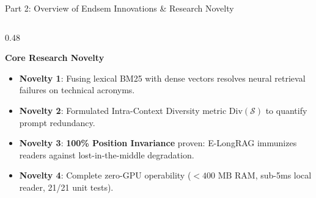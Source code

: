 \documentclass[10pt,aspectratio=169]{beamer}
\begin{document}
\begin{frame}{Part 2: Overview of Endsem Innovations \& Research Novelty}
\begin{columns}[onlytextwidth,T]
        \begin{column}{0.48\textwidth}
            \begin{alertblock}{\textbf{Core Research Novelty}}
                \footnotesize
                \begin{itemize}\setlength\itemsep{1.5pt}
                    \item \textbf{Novelty 1}: Fusing lexical BM25 with dense vectors resolves neural retrieval failures on technical acronyms.
                    \item \textbf{Novelty 2}: Formulated Intra-Context Diversity metric $\text{Div}(\mathcal{S})$ to quantify prompt redundancy.
                    \item \textbf{Novelty 3}: \textbf{100\% Position Invariance} proven: E-LongRAG immunizes readers against lost-in-the-middle degradation.
                    \item \textbf{Novelty 4}: Complete zero-GPU operability ($<400\text{ MB}$ RAM, sub-5ms local reader, 21/21 unit tests).
                \end{itemize}
            \end{alertblock}
        \end{column}
    \end{columns}
\end{frame}
\end{document}
